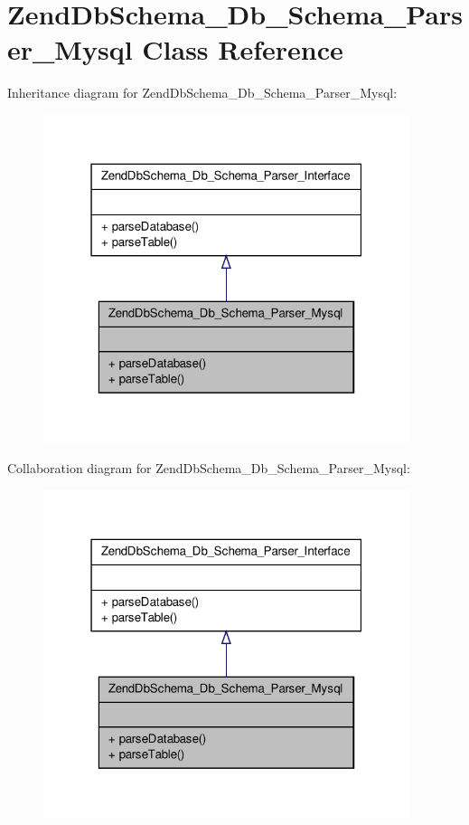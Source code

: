 \hypertarget{classZendDbSchema__Db__Schema__Parser__Mysql}{\section{\-Zend\-Db\-Schema\-\_\-\-Db\-\_\-\-Schema\-\_\-\-Parser\-\_\-\-Mysql \-Class \-Reference}
\label{classZendDbSchema__Db__Schema__Parser__Mysql}
}


\-Inheritance diagram for \-Zend\-Db\-Schema\-\_\-\-Db\-\_\-\-Schema\-\_\-\-Parser\-\_\-\-Mysql\-:\nopagebreak
\begin{figure}[H]
\begin{center}
\leavevmode
\includegraphics[width=304pt]{classZendDbSchema__Db__Schema__Parser__Mysql__inherit__graph}
\end{center}
\end{figure}


\-Collaboration diagram for \-Zend\-Db\-Schema\-\_\-\-Db\-\_\-\-Schema\-\_\-\-Parser\-\_\-\-Mysql\-:\nopagebreak
\begin{figure}[H]
\begin{center}
\leavevmode
\includegraphics[width=304pt]{classZendDbSchema__Db__Schema__Parser__Mysql__coll__graph}
\end{center}
\end{figure}
